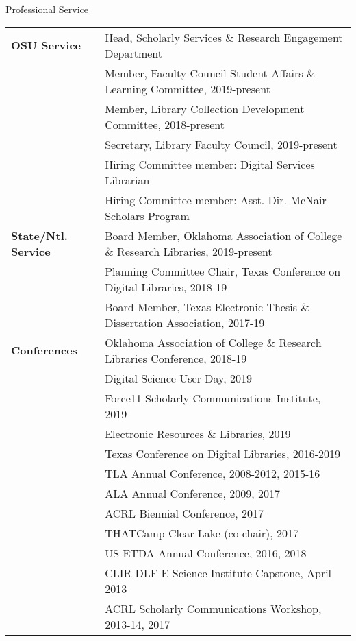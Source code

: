 \documentclass{resume} %
\begin{document}
\pagebreak

\begin{rSection}{Professional Service}

\begin{tabular}{ @{} >{\bfseries}l @{\hspace{2ex}} l }
OSU Service & Head, Scholarly Services \& Research Engagement Department \\
	& Member, Faculty Council Student Affairs \& Learning Committee, 2019-present \\
	& Member, Library Collection Development Committee, 2018-present \\
	& Secretary, Library Faculty Council, 2019-present \\
	& Hiring Committee member: Digital Services Librarian \\
	& Hiring Committee member: Asst. Dir. McNair Scholars Program \\
State/Ntl. Service & Board Member, Oklahoma Association of College \& Research Libraries, 2019-present \\
	& Planning Committee Chair, Texas Conference on Digital Libraries, 2018-19 \\
	& Board Member, Texas Electronic Thesis \& Dissertation Association, 2017-19 \\
Conferences & Oklahoma Association of College \& Research Libraries Conference, 2018-19 \\
	& Digital Science User Day, 2019 \\
	& Force11 Scholarly Communications Institute, 2019 \\
	& Electronic Resources \& Libraries, 2019 \\
	& Texas Conference on Digital Libraries, 2016-2019 \\
	 & TLA Annual Conference, 2008-2012, 2015-16 \\
	 & ALA Annual Conference, 2009, 2017 \\
	 & ACRL Biennial Conference, 2017 \\
	 & THATCamp Clear Lake (co-chair), 2017 \\
	 & US ETDA Annual Conference, 2016, 2018 \\
	 & CLIR-DLF E-Science Institute Capstone, April 2013 \\
	 & ACRL Scholarly Communications Workshop, 2013-14, 2017 \\

\end{tabular}
\end{rSection}
\end{document}
